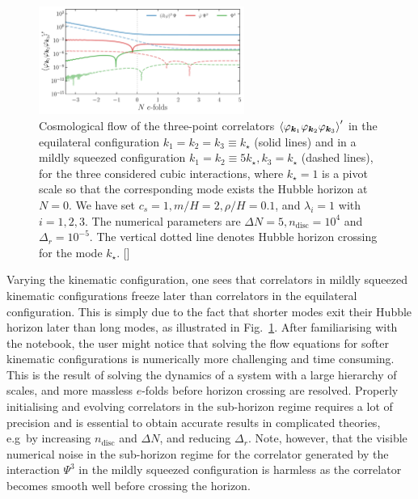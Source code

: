 \documentclass[11pt]{article}
\numberwithin{equation}{section} %
\begin{document}
\begin{figure}[h!]
  \centering
  \includegraphics[width=0.6\textwidth]{Figures/PhiPsi_CubicInteractions.pdf}
  \vspace*{0.2cm}
  \caption{Cosmological flow of the three-point correlators $\braket{\varphi_{\bm{k}_1} \varphi_{\bm{k}_2} \varphi_{\bm{k}_3}}'$ in the equilateral configuration $k_1=k_2=k_3\equiv k_\star$ (solid lines) and in a mildly squeezed configuration $k_1=k_2\equiv 5k_\star, k_3=k_\star$ (dashed lines), for the three considered cubic interactions, where $k_\star=1$ is a pivot scale so that the corresponding mode exists the Hubble horizon at $N=0$. We have set $c_s=1, m/H=2, \rho/H=0.1$, and $\lambda_i = 1$ with $i=1, 2, 3$. The numerical parameters are $\Delta N = 5, n_{\text{disc}} = 10^4$ and $\Delta_r = 10^{-5}$. The vertical dotted line denotes Hubble horizon crossing for the mode $k_\star$. [\href{https://github.com/deniswerth/CosmoFlow/blob/main/CosmoFlow/PhiPsi/TimeEvolution.ipynb}{\faGithub}]}
  \label{fig: PhiPsi cubic interactions}
\end{figure}

\vskip 4pt
Varying the kinematic configuration, one sees that correlators in mildly squeezed kinematic configurations freeze later than correlators in the equilateral configuration. This is simply due to the fact that shorter modes exit their Hubble horizon later than long modes, as illustrated in Fig.~\ref{fig: PhiPsi cubic interactions}. After familiarising with the notebook, the user might notice that solving the flow equations for softer kinematic configurations is numerically more challenging and time consuming. This is the result of solving the dynamics of a system with a large hierarchy of scales, and more massless $e$-folds before horizon crossing are resolved. Properly initialising and evolving correlators in the sub-horizon regime requires a lot of precision and is essential to obtain accurate results in complicated theories, e.g~by increasing $n_{\text{disc}}$ and $\Delta N$, and reducing $\Delta_r$. Note, however, that the visible numerical noise in the sub-horizon regime for the correlator generated by the interaction $\Psi^3$ in the mildly squeezed configuration is harmless as the correlator becomes smooth well before crossing the horizon. 
\end{document}

